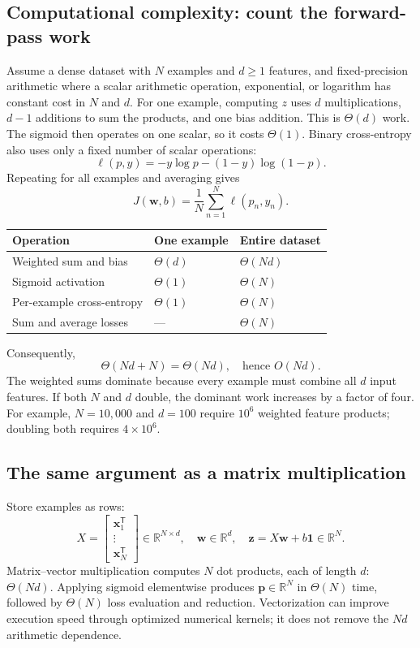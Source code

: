 \subsection{Computational complexity: count the forward-pass work}
Assume a dense dataset with $N$ examples and $d\geq1$ features, and fixed-precision arithmetic where a scalar arithmetic operation, exponential, or logarithm has constant cost in $N$ and $d$. For one example, computing $z$ uses $d$ multiplications, $d-1$ additions to sum the products, and one bias addition. This is $\Theta(d)$ work. The sigmoid then operates on one scalar, so it costs $\Theta(1)$. Binary cross-entropy also uses only a fixed number of scalar operations:
\[
 \ell(p,y)=-y\log p-(1-y)\log(1-p).
\]
Repeating for all examples and averaging gives
\[
 J(\mathbf{w},b)=\frac1N\sum_{n=1}^N\ell(p_n,y_n).
\]
\begin{center}
\begin{tabular}{lll}
\toprule
Operation & One example & Entire dataset\\
\midrule
Weighted sum and bias & $\Theta(d)$ & $\Theta(Nd)$\\
Sigmoid activation & $\Theta(1)$ & $\Theta(N)$\\
Per-example cross-entropy & $\Theta(1)$ & $\Theta(N)$\\
Sum and average losses & --- & $\Theta(N)$\\
\bottomrule
\end{tabular}
\end{center}
Consequently,
\[
 \boxed{\Theta(Nd+N)=\Theta(Nd),\quad\text{hence }O(Nd).}
\]
The weighted sums dominate because every example must combine all $d$ input features. If both $N$ and $d$ double, the dominant work increases by a factor of four. For example, $N=10{,}000$ and $d=100$ require $10^6$ weighted feature products; doubling both requires $4\times10^6$.

\subsection{The same argument as a matrix multiplication}
Store examples as rows:
\[
 X=\begin{bmatrix}\mathbf{x}_1^{\mathsf T}\\\vdots\\\mathbf{x}_N^{\mathsf T}\end{bmatrix}
 \in\mathbb{R}^{N\times d},\quad
 \mathbf{w}\in\mathbb{R}^{d},\quad
 \mathbf{z}=X\mathbf{w}+b\mathbf{1}\in\mathbb{R}^{N}.
\]
Matrix--vector multiplication computes $N$ dot products, each of length $d$: $\Theta(Nd)$. Applying sigmoid elementwise produces $\mathbf{p}\in\mathbb{R}^N$ in $\Theta(N)$ time, followed by $\Theta(N)$ loss evaluation and reduction. Vectorization can improve execution speed through optimized numerical kernels; it does not remove the $Nd$ arithmetic dependence.

